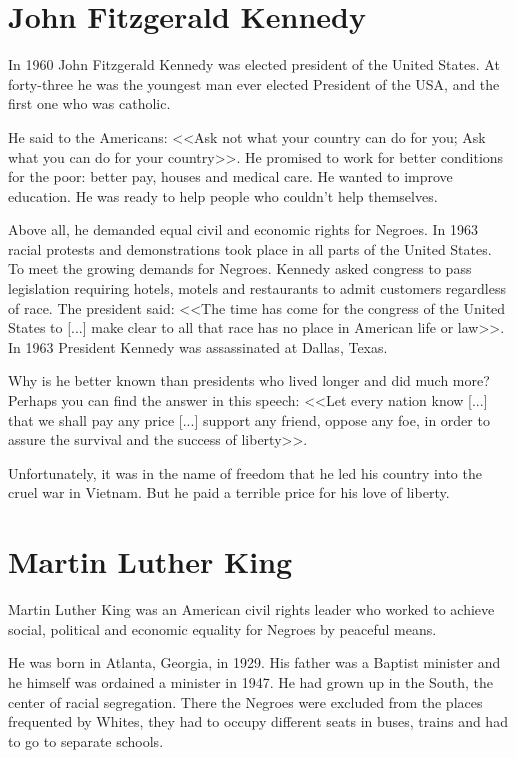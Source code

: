 \section{John Fitzgerald Kennedy}
In 1960 John Fitzgerald Kennedy was elected president of the United States. At forty-three he was the youngest man ever elected President of the USA, and the first one who was catholic.

He said to the Americans: <<Ask not what your country can do for you; Ask what you can do for your country>>. He promised to work for better conditions for the poor: better pay, houses and medical care. He wanted to improve education. He was ready to help people who couldn't help themselves.

Above all, he demanded equal civil and economic rights for Negroes. In 1963 racial protests and demonstrations took place in all parts of the United States. To meet the growing demands for Negroes. Kennedy asked congress to pass legislation requiring hotels, motels and restaurants to admit customers regardless of race. The president said: <<The time has come for the congress of the United States to [...] make clear to all that race has no place in American life or law>>. In 1963 President Kennedy was assassinated at Dallas, Texas.

Why is he better known than presidents who lived longer and did much more? Perhaps you can find the answer in this speech: <<Let every nation know [...] that we shall pay any price [...] support any friend, oppose any foe, in order to assure the survival and the success of liberty>>.

Unfortunately, it was in the name of freedom that he led his country into the cruel war in Vietnam. But he paid a terrible price for his love of liberty.

\section{Martin Luther King}
Martin Luther King was an American civil rights leader who worked to achieve social, political and economic equality for Negroes by peaceful means.

He was born in Atlanta, Georgia, in 1929. His father was a Baptist minister and he himself was ordained a minister in 1947. He had grown up in the South, the center of racial segregation. There the Negroes were excluded from the places frequented by Whites, they had to occupy different seats in buses, trains and had to go to separate schools.

